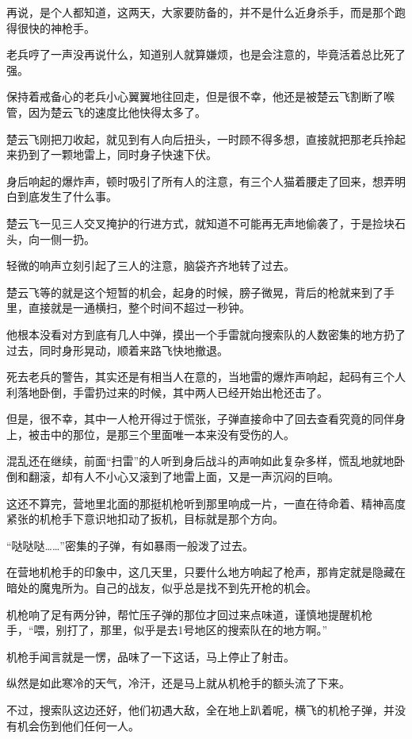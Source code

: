 再说，是个人都知道，这两天，大家要防备的，并不是什么近身杀手，而是那个跑得很快的神枪手。

老兵哼了一声没再说什么，知道别人就算嫌烦，也是会注意的，毕竟活着总比死了强。

保持着戒备心的老兵小心翼翼地往回走，但是很不幸，他还是被楚云飞割断了喉管，因为楚云飞的速度比他快得太多了。

楚云飞刚把刀收起，就见到有人向后扭头，一时顾不得多想，直接就把那老兵拎起来扔到了一颗地雷上，同时身子快速下伏。

身后响起的爆炸声，顿时吸引了所有人的注意，有三个人猫着腰走了回来，想弄明白到底发生了什么事。

楚云飞一见三人交叉掩护的行进方式，就知道不可能再无声地偷袭了，于是捡块石头，向一侧一扔。

轻微的响声立刻引起了三人的注意，脑袋齐齐地转了过去。

楚云飞等的就是这个短暂的机会，起身的时候，膀子微晃，背后的枪就来到了手里，直接就是一通横扫，整个时间不超过一秒钟。

他根本没看对方到底有几人中弹，摸出一个手雷就向搜索队的人数密集的地方扔了过去，同时身形晃动，顺着来路飞快地撤退。

死去老兵的警告，其实还是有相当人在意的，当地雷的爆炸声响起，起码有三个人利落地卧倒，手雷扔过来的时候，其中两人已经开始出枪还击了。

但是，很不幸，其中一人枪开得过于慌张，子弹直接命中了回去查看究竟的同伴身上，被击中的那位，是那三个里面唯一本来没有受伤的人。

混乱还在继续，前面“扫雷”的人听到身后战斗的声响如此复杂多样，慌乱地就地卧倒和翻滚，却有人不小心又滚到了地雷上面，又是一声沉闷的巨响。

这还不算完，营地里北面的那挺机枪听到那里响成一片，一直在待命着、精神高度紧张的机枪手下意识地扣动了扳机，目标就是那个方向。

“哒哒哒……”密集的子弹，有如暴雨一般泼了过去。

在营地机枪手的印象中，这几天里，只要什么地方响起了枪声，那肯定就是隐藏在暗处的魔鬼所为。自己的战友，似乎总是找不到先开枪的机会。

机枪响了足有两分钟，帮忙压子弹的那位才回过来点味道，谨慎地提醒机枪手，“喂，别打了，那里，似乎是去1号地区的搜索队在的地方啊。”

机枪手闻言就是一愣，品味了一下这话，马上停止了射击。

纵然是如此寒冷的天气，冷汗，还是马上就从机枪手的额头流了下来。

不过，搜索队这边还好，他们初遇大敌，全在地上趴着呢，横飞的机枪子弹，并没有机会伤到他们任何一人。

